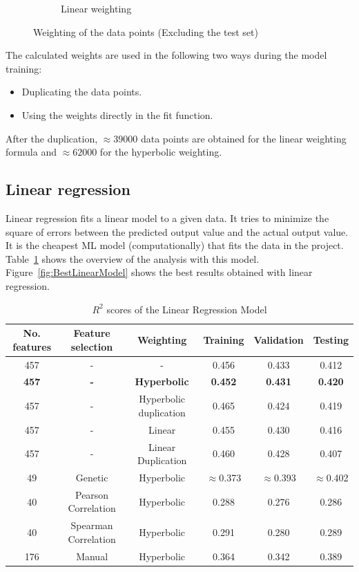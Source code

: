 \documentclass[11pt]{article}
\begin{document}
\begin{figure}
\begin{subfigure}[b]{0.45\textwidth}
        \caption{Linear weighting}
        \label{fig:linearweightdistribution}
     \end{subfigure}
     \caption{Weighting of the data points (Excluding the test set)}
     \label{fig:WeightDistribution}
\end{figure}

The calculated weights are used in the following two ways during the model training:

\begin{itemize}
\item Duplicating the data points.
\item Using the weights directly in the fit function.
\end{itemize}

After the duplication, $\approx 39000$ data points are obtained for the linear weighting formula and $\approx 62000$ for the hyperbolic weighting.

\subsection{Linear regression}
Linear regression fits a linear model to a given data.
It tries to minimize the square of errors between the predicted output value and the actual output value.
It is the cheapest ML model (computationally) that fits the data in the project.
Table~\ref{table:1} shows the overview of the analysis with this model.
Figure~\ref{fig:BestLinearModel} shows the best results obtained with linear regression.

\begin{table} [h!]
\centering
\resizebox{\linewidth}{!} {
\begin{tabular}{ | c | c | c | c | c | c | }
\hline
\textbf{No.  features} & \textbf{Feature selection} & \textbf{Weighting} & \textbf{Training} & \textbf{Validation} & \textbf{Testing} \\ [0.5 ex]
\hline \hline
457 & - & - & 0.456 & 0.433 & 0.412\\
\textbf{457} &  \textbf{-} & \textbf{Hyperbolic} & \textbf{0.452} & \textbf{0.431} & \textbf{0.420}\\
457 & - & Hyperbolic duplication & 0.465 & 0.424 & 0.419\\
457 & - & Linear & 0.455 & 0.430 & 0.416\\
457 & - & Linear Duplication & 0.460 & 0.428 & 0.407\\
49 & Genetic\footnotemark[1] & Hyperbolic & $\approx$0.373 & $\approx$0.393  & $\approx$0.402\\
40 & Pearson Correlation & Hyperbolic & 0.288 & 0.276  & 0.286 \\ 
40 & Spearman Correlation & Hyperbolic & 0.291 & 0.280  & 0.289 \\ 
176 & Manual & Hyperbolic & 0.364  & 0.342  & 0.389\\ [1ex]
\hline
\end{tabular}
}
\caption{$R^2$ scores of the Linear Regression Model}
\label {table:1}
\end{table}
\end{document}
